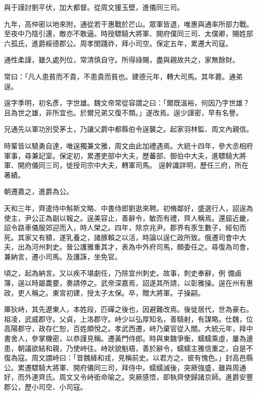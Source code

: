 \begin{pinyinscope}
 與于謹討劉平伏，加大都督。從周文援玉壁，進儀同三司。



 九年，高仲密以地來附，通從若干惠戰於芒山。眾軍皆退，唯惠與通率所部力戰。至夜中乃陰引還，敵亦不敢逼。時授驃騎大將軍、開府僕同三司、太僕卿，賜姓部六孤氏，進爵綏德郡公。周孝閔踐祚，拜小司空。保定五年，累遷大司寇。



 通性柔謹，雖久處列位，常清慎自守。所得祿賜，盡與親故共之，家無餘財。



 常曰：「凡人患貧而不貴，不患貴而貧也。建德元年，轉大司馬。其年薨。通弟逞。



 逞字季明，初名彥，字世雄。魏文帝常從容謂之曰：「爾既溫裕，何因乃字世雄？且為世之雄，非所宜也。於爾兄弟又復不類。」遂改焉。逞少謹密，早有名譽。



 兄通先以軍功別受茅土，乃讓父爵中都縣伯令逞襲之。起家羽林監、周文內親信。



 時輩皆以驍勇自達，唯逞獨兼文雅，周文由此加禮遇焉。大統十四年，參大丞相府軍事，尋兼記室。保定初，累遷吏部中大夫，歷蕃部、御伯中大夫，進驃騎大將軍、開府儀同三司，徙授司宗中大夫，轉軍司馬。
 逞幹識詳明，歷任三府，所在著績。



 朝遷嘉之，進爵為公。



 天和三年，齊遣侍中斛斯文略、中書侍郎劉逖來聘。初脩鄰好，盛選行人，詔逞為使主，尹公正為副以報之。逞美容止，善辭令，敏而有禮，齊人稱焉。還屆近畿，詔令路車儀服郊迎而入，時人榮之。四年，除京兆尹。郡界有豕生數子，經旬而死。其家又有豶，遂乳養之，諸豚賴之以活，時論以逞仁政所致。俄遷司會中大夫，出為河州刺史。晉公護雅重其才，表為中外府司馬，頗委任之。尋復為司會，兼納言，遷小司馬。及護誅，坐免官。



 頃之，起為納言。又以疾不堪劇任，乃除宜州刺史。故事，刺史奉辭，例
 備鹵簿，逞以時屬農要，奏請停之。武帝深嘉焉，詔遂其所請，以彰雅操。逞在州有惠政，吏人稱之。東宮初建，授太子太保。卒，贈大將軍。子操嗣。



 厙狄峙，其先遼東人，本姓段，匹磾之後也，因避難改焉。後徙居代，世為豪右。祖凌，武威郡守。父貞，上洛郡守。峙少以弘厚知名，善騎射，有謀略。仕魏，位高陽郡守，政存仁恕，百姓頗悅之。孝武西遷，峙乃棄官從入關。大統元年，拜中書舍人，參掌機密，以恭謹見稱。遷黃門侍郎。時與東魏爭衡，蠕蠕乘虛，屢為邊患，朝議欲結和親，乃使峙往。峙狀貌魁梧，善於辭令，蠕蠕主雅信重之，自是不
 復為寇。周文謂峙曰：「昔魏絳和戎，見稱前史。以君方之，彼有愧色。」封高邑縣公。累遷驃騎大將軍、開府儀同三司，拜侍中。蠕蠕滅後，突厥強盛，雖與周通好，而外連齊氏。周文又令峙銜命喻之。突厥感悟，即執齊使歸諸京師。進爵安豐郡公，歷小司空、小司寇。




\end{pinyinscope}
